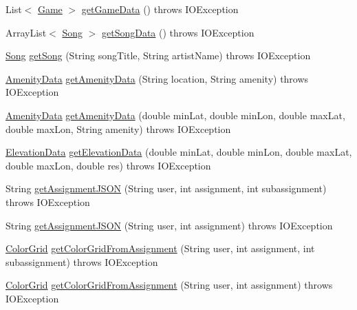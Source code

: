 \begin{DoxyCompactItemize}
\item 
List$<$ \hyperlink{classbridges_1_1data__src__dependent_1_1_game}{Game} $>$ \hyperlink{classbridges_1_1connect_1_1_data_source_ab3744c6b103281724bdd832da0924312}{get\+Game\+Data} ()  throws I\+O\+Exception 
\item 
Array\+List$<$ \hyperlink{classbridges_1_1data__src__dependent_1_1_song}{Song} $>$ \hyperlink{classbridges_1_1connect_1_1_data_source_aeccb689aeacc094b0621ab5564849fa6}{get\+Song\+Data} ()  throws I\+O\+Exception 
\item 
\hyperlink{classbridges_1_1data__src__dependent_1_1_song}{Song} \hyperlink{classbridges_1_1connect_1_1_data_source_a935ea2005b7de3cb22c1e55027b81460}{get\+Song} (String song\+Title, String artist\+Name)  throws I\+O\+Exception 
\item 
\hyperlink{classbridges_1_1data__src__dependent_1_1_amenity_data}{Amenity\+Data} \hyperlink{classbridges_1_1connect_1_1_data_source_aa25f4d7521aa1ad788b60816eb2088db}{get\+Amenity\+Data} (String location, String amenity)  throws I\+O\+Exception 
\item 
\hyperlink{classbridges_1_1data__src__dependent_1_1_amenity_data}{Amenity\+Data} \hyperlink{classbridges_1_1connect_1_1_data_source_a4fdb7ddbeecaa30a4e6972c0b537bb44}{get\+Amenity\+Data} (double min\+Lat, double min\+Lon, double max\+Lat, double max\+Lon, String amenity)  throws I\+O\+Exception 
\item 
\hyperlink{classbridges_1_1data__src__dependent_1_1_elevation_data}{Elevation\+Data} \hyperlink{classbridges_1_1connect_1_1_data_source_ac3aec28786d148e6b3554c78679bb4c2}{get\+Elevation\+Data} (double min\+Lat, double min\+Lon, double max\+Lat, double max\+Lon, double res)  throws I\+O\+Exception 
\item 
String \hyperlink{classbridges_1_1connect_1_1_data_source_af2f6cd7172acb64b2ba49f134b5391f8}{get\+Assignment\+J\+S\+ON} (String user, int assignment, int subassignment)  throws I\+O\+Exception 
\item 
String \hyperlink{classbridges_1_1connect_1_1_data_source_af55c85da71b588f64ff4b46dbacab7f4}{get\+Assignment\+J\+S\+ON} (String user, int assignment)  throws I\+O\+Exception 
\item 
\hyperlink{classbridges_1_1base_1_1_color_grid}{Color\+Grid} \hyperlink{classbridges_1_1connect_1_1_data_source_a7bddb93c9196a1109f2bf36054500ed8}{get\+Color\+Grid\+From\+Assignment} (String user, int assignment, int subassignment)  throws I\+O\+Exception 
\item 
\hyperlink{classbridges_1_1base_1_1_color_grid}{Color\+Grid} \hyperlink{classbridges_1_1connect_1_1_data_source_a19356653cc7ae56f57f5d28994048ee3}{get\+Color\+Grid\+From\+Assignment} (String user, int assignment)  throws I\+O\+Exception 
\end{DoxyCompactItemize}

